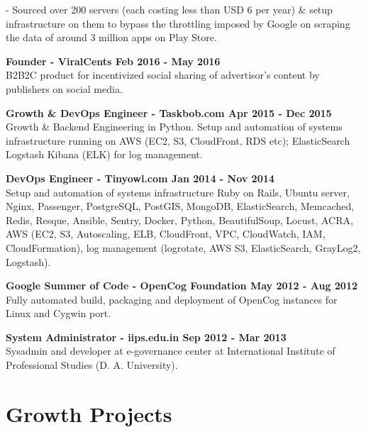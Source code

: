 \documentclass[overlapped,centered]{resume}
\begin{document}
\begin{resume}
\begin{list2}
		- Sourced over 200 servers (each costing less than USD 6 per year) \& setup infrastructure on them to bypass the throttling imposed by Google on scraping the data of around 3 million apps on Play Store.

	\setlength{\leftskip}{0pt}

    \item \textbf{Founder - ViralCents \hspace{75mm} Feb 2016 - May 2016} \\ B2B2C product for incentivized social sharing of advertisor's content by publishers on social media.
    
    \item \textbf{Growth \& DevOps Engineer - Taskbob.com \hspace{45mm} Apr 2015 - Dec 2015} \\ Growth \& Backend Engineering in Python. Setup and automation of systems infrastructure running on AWS (EC2, S3, CloudFront, RDS etc); ElasticSearch Logstash Kibana (ELK) for log management.
    
    \item \textbf{DevOps Engineer - Tinyowl.com \hspace{65mm} Jan 2014 - Nov 2014} \\ Setup and automation of systems infrastructure Ruby on Rails, Ubuntu server, Nginx, Passenger, PostgreSQL, PostGIS, MongoDB, ElasticSearch, Memcached, Redis, Resque, Ansible, Sentry, Docker, Python, BeautifulSoup, Locust, ACRA, AWS (EC2, S3, Autoscaling, ELB, CloudFront, VPC, CloudWatch, IAM, CloudFormation), log management (logrotate, AWS S3, ElasticSearch, GrayLog2, Logstash).
    
	\item \textbf{Google Summer of Code - OpenCog Foundation \hspace{35mm} May 2012 - Aug 2012} \\ Fully automated build, packaging and deployment of OpenCog instances for Linux and Cygwin port.

	\item \textbf{System Administrator - iips.edu.in \hspace{60mm} Sep 2012 - Mar 2013} \\ Sysadmin and developer at e-governance center at International Institute of Professional Studies (D. A. University).

	\end{list2}

    \section{\mysidestyle Growth Projects} 
	\begin{list2}
	

\end{list2}
\end{resume}
\end{document}
